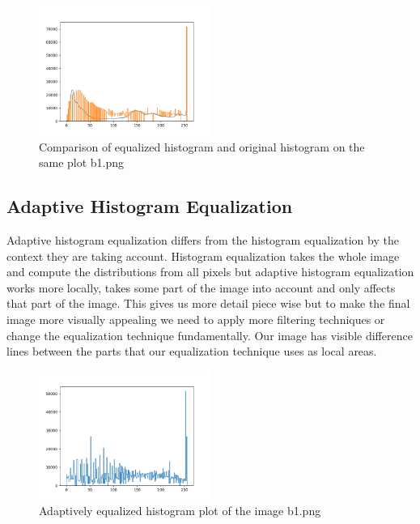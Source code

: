 \documentclass[conference]{IEEEtran}
\begin{document}
\begin{figure}[]
    \centering
    \includegraphics[width=0.5\textwidth]{resources/equalized_histogram_comp.png}
    \caption{Comparison of equalized histogram and original histogram on the same plot b1.png}
    \label{fig:plot3}
\end{figure}


\subsection{Adaptive Histogram Equalization}
Adaptive histogram equalization differs from the histogram equalization by the context they are taking account. Histogram equalization takes the whole image and compute the distributions from all pixels but adaptive histogram equalization works more locally, takes some part of the image into account and only affects that part of the image. This gives us more detail piece wise but to make the final image more visually appealing we need to apply more filtering techniques or change the equalization technique fundamentally. Our image has visible difference lines between the parts that our equalization technique  uses as local areas.

\begin{figure}[]
    \centering
    \includegraphics[width=0.5\textwidth]{resources/adaptive_equalized_histogram.png}
    \caption{Adaptively equalized histogram plot of the image b1.png}
    \label{fig:plot4}
\end{figure}
\end{document}
